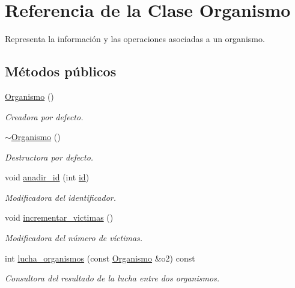 \hypertarget{class_organismo}{\section{\-Referencia de la \-Clase \-Organismo}
\label{class_organismo}
}


\-Representa la información y las operaciones asociadas a un organismo.  


\subsection*{\-Métodos públicos}
\begin{DoxyCompactItemize}
\item 
\hyperlink{class_organismo_aa5dbeed205b53c0e555ef2a6456da144}{\-Organismo} ()
\begin{DoxyCompactList}\small\item\em \-Creadora por defecto. \end{DoxyCompactList}\item 
\hyperlink{class_organismo_ad1ba743e609a358f1479ebf341220747}{$\sim$\-Organismo} ()
\begin{DoxyCompactList}\small\item\em \-Destructora por defecto. \end{DoxyCompactList}\item 
void \hyperlink{class_organismo_a4fa50ea637c25ee2b04bd1805ec634dc}{anadir\-\_\-id} (int \hyperlink{class_organismo_a30be1823d3711fec651a5a4b1dc1cee5}{id})
\begin{DoxyCompactList}\small\item\em \-Modificadora del identificador. \end{DoxyCompactList}\item 
void \hyperlink{class_organismo_ae498385e40b42c4e9b11226befd6e4c6}{incrementar\-\_\-victimas} ()
\begin{DoxyCompactList}\small\item\em \-Modificadora del número de víctimas. \end{DoxyCompactList}\item 
int \hyperlink{class_organismo_a2f4573f69288fa8ec05ec709f2336a8d}{lucha\-\_\-organismos} (const \hyperlink{class_organismo}{\-Organismo} \&o2) const 
\begin{DoxyCompactList}\small\item\em \-Consultora del resultado de la lucha entre dos organismos. \end{DoxyCompactList}\item 

\end{DoxyCompactItemize}

